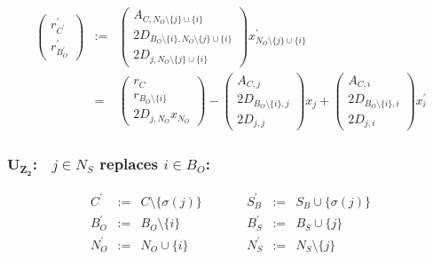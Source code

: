 \documentclass[a4paper]{article}
\begin{document}
\begin{eqnarray}
\left(
\begin{array}{c}
r_{C^{\prime}}^{\prime} \\
\hline
r_{B_{O}^{\prime}}^{\prime}
\end{array}
\right)
&:=&
\left(
\begin{array}{c}
A_{C, N_{O} \setminus\{j\} \cup \{i\}} \\
\hline
2D_{B_{O} \setminus \{i\}, N_{O} \setminus\{j\} \cup \{i\}} \\
\hline
2D_{j, N_{O} \setminus\{j\} \cup \{i\}}
\end{array}
\right)
x_{N_{O} \setminus\{j\} \cup \{i\}}^{\prime}
\nonumber \\
&=&
\left(
\begin{array}{c}
r_{C} \\
\hline
r_{B_{O} \setminus \{i\}} \\
\hline
2D_{j, N_{O}}x_{N_{O}}
\end{array}
\right)
-
\left(
\begin{array}{c}
A_{C, j} \\
\hline
2D_{B_{O} \setminus \{i\}, j} \\
\hline
2D_{j, j}
\end{array}
\right)
x_{j}
+
\left(
\begin{array}{c}
A_{C, i} \\
\hline
2D_{B_{O} \setminus \{i\}, i} \\
\hline
2D_{j,i}
\end{array}
\right)
x_{i}^{\prime}
\end{eqnarray}

\subsubsection{$\mathbf{U_{Z_{2}}}$:$\quad j \in N_{S}$ replaces $i \in B_{O}$:}
\begin{equation}
\label{update:s_z_rep_o}
\begin{array}{ccccccc}
C^{\prime}      &:=&  C \setminus \{\sigma(j)\}
&\quad\quad&
S_{B}^{\prime}  &:=&  S_{B} \cup  \{\sigma(j)\}   \\
B_{O}^{\prime}  &:=&  B_{O} \setminus \{i\}
&\quad\quad&
B_{S}^{\prime}  &:=&  B_{S} \cup \{j\} \\
N_{O}^{\prime}  &:=&  N_{O} \cup \{i\}
&\quad\quad&
N_{S}^{\prime}  &:=&  N_{S} \setminus \{j\}
\end{array}
\end{equation}
\end{document}
